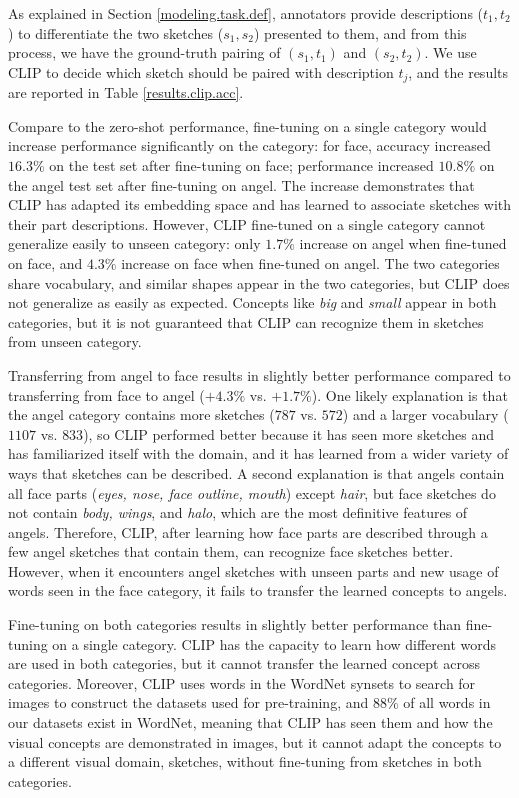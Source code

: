 As explained in Section \ref{modeling.task.def}, annotators provide descriptions ($t_1,t_2$) to differentiate the two sketches ($s_1,s_2$) presented to them, and from this process, we have the ground-truth pairing of $(s_1,t_1)$ and $(s_2,t_2)$. We use CLIP to decide which sketch should be paired with description $t_j$, and the results are reported in Table \ref{results.clip.acc}. 

Compare to the zero-shot performance, fine-tuning on a single category would increase performance significantly on the category: for face, accuracy increased $16.3\%$ on the test set after fine-tuning on face; performance increased $10.8\%$ on the angel test set after fine-tuning on angel. The increase demonstrates that CLIP has adapted its embedding space and has learned to associate sketches with their part descriptions. 
However, CLIP fine-tuned on a single category cannot generalize easily to unseen category: only $1.7\%$ increase on angel when fine-tuned on face, and $4.3\%$ increase on face when fine-tuned on angel.   
The two categories share vocabulary, and similar shapes appear in the two categories, but CLIP does not generalize as easily as expected. Concepts like \textit{big} and \textit{small} appear in both categories, but it is not guaranteed that CLIP can recognize them in sketches from unseen category.  

Transferring from angel to face results in slightly better performance compared to transferring from face to angel ($+4.3\%$ vs. $+1.7\%$). One likely explanation is that the angel category contains more sketches ($787$ vs. $572$) and a larger vocabulary ($1107$ vs. $833$), so CLIP performed better because it has seen more sketches and has familiarized itself with the domain, and it has learned from a wider variety of ways that sketches can be described. A second explanation is that angels contain all face parts (\textit{eyes, nose, face outline, mouth}) except \textit{hair}, but face sketches do not contain \textit{body, wings}, and \textit{halo}, which are the most definitive features of angels. Therefore, CLIP, after learning how face parts are described through a few angel sketches that contain them, can recognize face sketches better. However, when it encounters angel sketches with unseen parts and new usage of words seen in the face category, it fails to transfer the learned concepts to angels.         

Fine-tuning on both categories results in slightly better performance than fine-tuning on a single category. CLIP has the capacity to learn how different words are used in both categories, but it cannot transfer the learned concept across categories. Moreover, CLIP uses words in the WordNet synsets to search for images to construct the datasets used for pre-training, and $88\%$ of all words in our datasets exist in WordNet, meaning that CLIP has seen them and how the visual concepts are demonstrated in images, but it cannot adapt the concepts to a different visual domain, sketches, without fine-tuning from sketches in both categories.        

